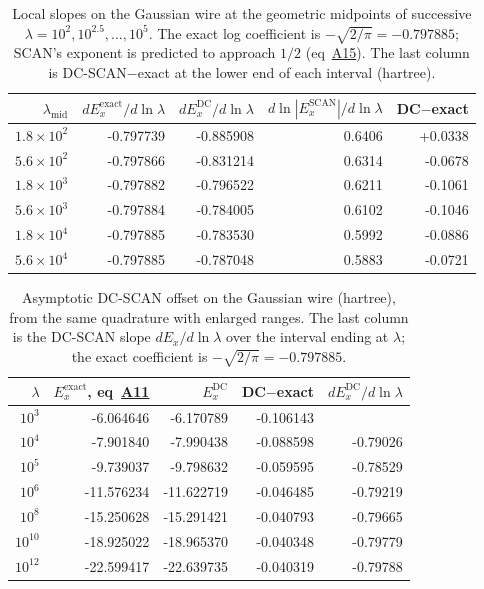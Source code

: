 \documentclass[journal=jctcce,manuscript=suppinfo]{achemso}
\begin{document}
\begin{table}[H]
\centering
\caption{Local slopes on the Gaussian wire at the geometric midpoints of
  successive $\lambda=10^{2},10^{2.5},\dots,10^{5}$.  The exact log
  coefficient is $-\sqrt{2/\pi}=-0.797885$; SCAN's exponent is predicted to
  approach $1/2$ (eq~\href{main.pdf\#equation.15}{A15}).  The last column is
  DC-SCAN$-$exact at the lower end of each interval (hartree).}
\label{tab:dcscan-asym}
\scriptsize
\begin{tabular}{@{}rrrrr@{}}
\toprule
$\lambda_{\mathrm{mid}}$ & $dE_x^{\mathrm{exact}}/d\ln\lambda$ & $dE_x^{\mathrm{DC}}/d\ln\lambda$ & $d\ln|E_x^{\mathrm{SCAN}}|/d\ln\lambda$ & DC$-$exact \\
\midrule
$1.8\times10^{2}$ & -0.797739 & -0.885908 & 0.6406 & +0.0338 \\
$5.6\times10^{2}$ & -0.797866 & -0.831214 & 0.6314 & -0.0678 \\
$1.8\times10^{3}$ & -0.797882 & -0.796522 & 0.6211 & -0.1061 \\
$5.6\times10^{3}$ & -0.797884 & -0.784005 & 0.6102 & -0.1046 \\
$1.8\times10^{4}$ & -0.797885 & -0.783530 & 0.5992 & -0.0886 \\
$5.6\times10^{4}$ & -0.797885 & -0.787048 & 0.5883 & -0.0721 \\

\bottomrule
\end{tabular}
\end{table}

\begin{table}[H]
\centering
\caption{Asymptotic DC-SCAN offset on the Gaussian wire (hartree), from the
  same quadrature with enlarged ranges.  The last column is the DC-SCAN slope
  $dE_x/d\ln\lambda$ over the interval ending at $\lambda$; the exact
  coefficient is $-\sqrt{2/\pi}=-0.797885$.}
\label{tab:dcscan-offset}
\scriptsize
\begin{tabular}{@{}rrrrr@{}}
\toprule
$\lambda$ & $E_x^{\mathrm{exact}}$, eq~\href{main.pdf\#equation.11}{A11} & $E_x^{\mathrm{DC}}$ & DC$-$exact & $dE_x^{\mathrm{DC}}/d\ln\lambda$ \\
\midrule
$10^{3}$ & -6.064646 & -6.170789 & -0.106143 &  \\
$10^{4}$ & -7.901840 & -7.990438 & -0.088598 & -0.79026 \\
$10^{5}$ & -9.739037 & -9.798632 & -0.059595 & -0.78529 \\
$10^{6}$ & -11.576234 & -11.622719 & -0.046485 & -0.79219 \\
$10^{8}$ & -15.250628 & -15.291421 & -0.040793 & -0.79665 \\
$10^{10}$ & -18.925022 & -18.965370 & -0.040348 & -0.79779 \\
$10^{12}$ & -22.599417 & -22.639735 & -0.040319 & -0.79788 \\

\bottomrule
\end{tabular}
\end{table}
\end{document}
